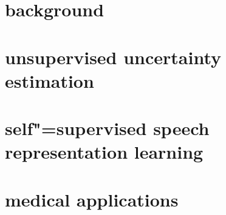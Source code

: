 \documentclass[\classfontsize,\papersize,twoside,showtrims,extrafontsizes]{memoir}  %
\begin{document}
\prefrontmatter

\cleartoevenpage

\cleartooddpage

\cleartoevenpage

\frontmatter





% 




\clearforchapter
\tableofcontents*

\clearforchapter
\mylistoftodos

\mainmatter

\part[background]{background}\label{part:background}




\part[unsupervised uncertainty estimation]{unsupervised uncertainty estimation}\label{part:unsupervised-uncertainty-estimation}



\part[self"=supervised speech representation learning]{self"=supervised speech representation learning}\label{part:self-supervised-speech-representation-learning}


\part[medical applications]{medical applications}\label{part:medical-applications}


\end{document}
